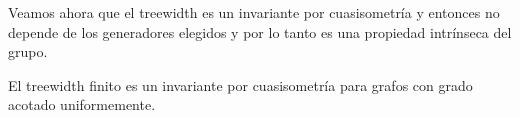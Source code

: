 \documentclass[tesis.tex]{subfiles}
\begin{document}

Veamos ahora que el treewidth es un invariante por cuasisometría y entonces no depende de los generadores elegidos y por lo tanto es una propiedad intrínseca del grupo. 

\begin{prop} \label{treewidth-inv}
	El treewidth finito es un invariante por cuasisometría para grafos con grado acotado uniformemente.
\end{prop}
%
%
%
\end{document}
